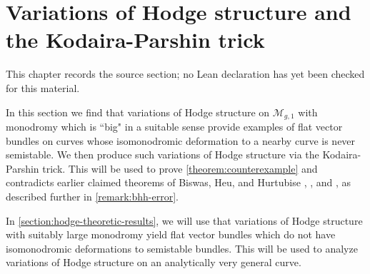 \chapter{Variations of Hodge structure and the Kodaira-Parshin trick}
\label{geometric-local-systems-general-curves-isomonodromy-chapter-05}

\begin{remark}
\label{geometric-local-systems-general-curves-isomonodromy-chapter-05-source}
This chapter records the source section; no Lean declaration has yet been checked for this material.
\notready
\end{remark}

\label{section:counterexample}

In this section we find that
variations of Hodge structure on $\mathscr{M}_{g,1}$ with monodromy which is
``big" in a suitable sense provide examples of flat vector bundles on curves
whose isomonodromic deformation to a nearby curve is never semistable. We then produce such variations of
Hodge structure via the Kodaira-Parshin trick.
This will be used to prove
\autoref{theorem:counterexample} and contradicts earlier claimed theorems of
Biswas, Heu, and Hurtubise
\cite[Theorem 1.3]{BHH:logarithmic},
\cite[Theorem 1.3]{BHH:irregular}, and
\cite[Theorem 1.2]{BHH:parabolic},
as described further in \autoref{remark:bhh-error}.

In \autoref{section:hodge-theoretic-results}, we will use that
variations of Hodge structure with suitably large monodromy yield flat vector
bundles which do not have isomonodromic deformations to semistable bundles.
This will be used to analyze variations of Hodge structure on an analytically very general curve.
